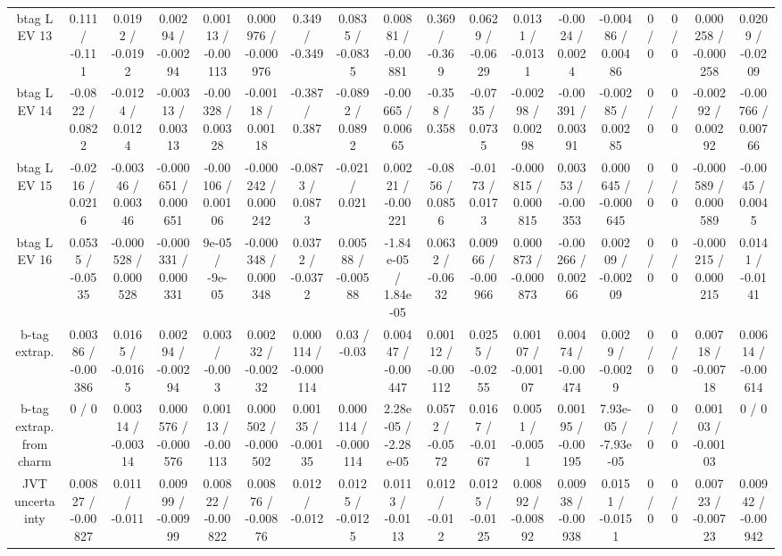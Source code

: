 \documentclass[10pt]{article}
\begin{document}
\begin{table}[htbp]
\begin{center}
\begin{tabular}{|c|c|c|c|c|c|c|c|c|c|c|c|c|c|c|c|c|c|}
  btag L EV 13 & 0.111 / -0.111 & 0.0192 / -0.0192 & 0.00294 / -0.00294 & 0.00113 / -0.00113 & 0.000976 / -0.000976 & 0.349 / -0.349 & 0.0835 / -0.0835 & 0.00881 / -0.00881 & 0.369 / -0.369 & 0.0629 / -0.0629 & 0.0131 / -0.0131 & -0.0024 / 0.0024 & -0.00486 / 0.00486 & 0 / 0 & 0 / 0 & 0.000258 / -0.000258 & 0.0209 / -0.0209 \\ 
  btag L EV 14 & -0.0822 / 0.0822 & -0.0124 / 0.0124 & -0.00313 / 0.00313 & -0.00328 / 0.00328 & -0.00118 / 0.00118 & -0.387 / 0.387 & -0.0892 / 0.0892 & -0.00665 / 0.00665 & -0.358 / 0.358 & -0.0735 / 0.0735 & -0.00298 / 0.00298 & -0.00391 / 0.00391 & -0.00285 / 0.00285 & 0 / 0 & 0 / 0 & -0.00292 / 0.00292 & -0.00766 / 0.00766 \\ 
  btag L EV 15 & -0.0216 / 0.0216 & -0.00346 / 0.00346 & -0.000651 / 0.000651 & -0.00106 / 0.00106 & -0.000242 / 0.000242 & -0.0873 / 0.0873 & -0.021 / 0.021 & 0.00221 / -0.00221 & -0.0856 / 0.0856 & -0.0173 / 0.0173 & -0.000815 / 0.000815 & 0.00353 / -0.00353 & 0.000645 / -0.000645 & 0 / 0 & 0 / 0 & -0.000589 / 0.000589 & -0.0045 / 0.0045 \\ 
  btag L EV 16 & 0.0535 / -0.0535 & -0.000528 / 0.000528 & -0.000331 / 0.000331 & 9e-05 / -9e-05 & -0.000348 / 0.000348 & 0.0372 / -0.0372 & 0.00588 / -0.00588 & -1.84e-05 / 1.84e-05 & 0.0632 / -0.0632 & 0.00966 / -0.00966 & 0.000873 / -0.000873 & -0.00266 / 0.00266 & 0.00209 / -0.00209 & 0 / 0 & 0 / 0 & -0.000215 / 0.000215 & 0.0141 / -0.0141 \\ 
  b-tag extrap. & 0.00386 / -0.00386 & 0.0165 / -0.0165 & 0.00294 / -0.00294 & 0.003 / -0.003 & 0.00232 / -0.00232 & 0.000114 / -0.000114 & 0.03 / -0.03 & 0.00447 / -0.00447 & 0.00112 / -0.00112 & 0.0255 / -0.0255 & 0.00107 / -0.00107 & 0.00474 / -0.00474 & 0.0029 / -0.0029 & 0 / 0 & 0 / 0 & 0.00718 / -0.00718 & 0.00614 / -0.00614 \\ 
  b-tag extrap. from charm & 0 / 0 & 0.00314 / -0.00314 & 0.000576 / -0.000576 & 0.00113 / -0.00113 & 0.000502 / -0.000502 & 0.00135 / -0.00135 & 0.000114 / -0.000114 & 2.28e-05 / -2.28e-05 & 0.0572 / -0.0572 & 0.0167 / -0.0167 & 0.0051 / -0.0051 & 0.00195 / -0.00195 & 7.93e-05 / -7.93e-05 & 0 / 0 & 0 / 0 & 0.00103 / -0.00103 & 0 / 0 \\ 
  JVT uncertainty & 0.00827 / -0.00827 & 0.011 / -0.011 & 0.00999 / -0.00999 & 0.00822 / -0.00822 & 0.00876 / -0.00876 & 0.012 / -0.012 & 0.0125 / -0.0125 & 0.0113 / -0.0113 & 0.012 / -0.012 & 0.0125 / -0.0125 & 0.00892 / -0.00892 & 0.00938 / -0.00938 & 0.0151 / -0.0151 & 0 / 0 & 0 / 0 & 0.00723 / -0.00723 & 0.00942 / -0.00942 \\ 

\end{tabular}
\end{center}
\end{table}
\end{document}
